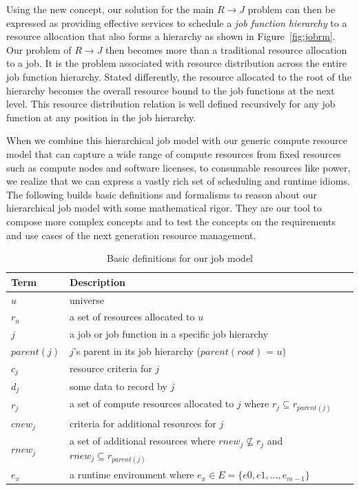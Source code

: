 Using the new concept, our solution for the main
$R \rightarrow J$ problem can then be expressed as
providing effective services to schedule
a {\em job function hierarchy} to a resource allocation
that also forms a hierarchy as shown in
Figure~\ref{fig:jobrm}.
Our problem of $R \rightarrow J$ then becomes more than a traditional
resource allocation to a job. It is the problem associated with
resource distribution across the entire job function hierarchy.
Stated differently, the resource allocated to the root of the hierarchy
becomes the overall resource bound to the job functions at
the next level. This resource distribution relation is well defined
recursively for any job function at any position in the job hierarchy.

When we combine this hierarchical job model with our generic
compute resource model that can capture a wide range
of compute resources from fixed resources such as compute nodes
and software licenses, to consumable resources like power,
we realize that we can express a vastly rich set
of scheduling and runtime idioms.
The following builds basic definitions and formalisms
to reason about our hierarchical job model with some mathematical rigor.
They are our tool to compose more complex concepts
and to test the concepts on the requirements and use cases
of the next generation resource management.

\begin{table}
\centering
\begin{tabular}{|l|l|}
\hline
Term & Description \\
\hline
$u$ & universe  \\
$r_u$ & a set of resources allocated to $u$ \\
$j$ & a job or job function in a specific job hierarchy \\
$parent(j)$ & $j$'s parent in its job hierarchy ($parent(root)$ = $u$) \\
$c_j$ & resource criteria for $j$ \\
$d_j$ & some data to record by $j$ \\
$r_j$ & a set of compute resources allocated to $j$ where $r_j \subseteq r_{parent(j)}$ \\
$cnew_j$ & criteria for additional resources for $j$ \\
$rnew_j$ & a set of additional resources where $rnew_j \not\subseteq r_j$ and $rnew_j \subseteq r_{parent(j)}$ \\
$e_x$ & a runtime environment where $e_x \in E = \{e0, e1, ..., e_{m-1}\}$ \\
\hline
\end{tabular}
\caption{Basic definitions for our job model}
\label{tab:def}
\end{table}

